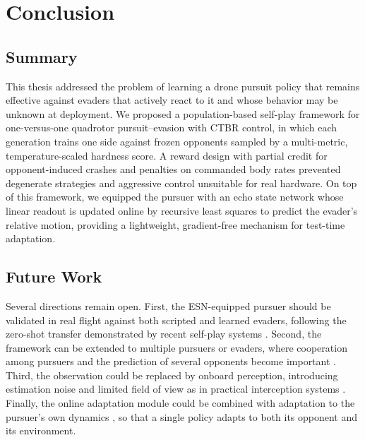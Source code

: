 
\chapter{Conclusion}
\label{ch:conclusion}

\section{Summary}
\noindent
This thesis addressed the problem of learning a drone pursuit policy that remains effective against evaders that actively react to it and whose behavior may be unknown at deployment. We proposed a population-based self-play framework for one-versus-one quadrotor pursuit--evasion with CTBR control, in which each generation trains one side against frozen opponents sampled by a multi-metric, temperature-scaled hardness score. A reward design with partial credit for opponent-induced crashes and penalties on commanded body rates prevented degenerate strategies and aggressive control unsuitable for real hardware. On top of this framework, we equipped the pursuer with an echo state network whose linear readout is updated online by recursive least squares to predict the evader's relative motion, providing a lightweight, gradient-free mechanism for test-time adaptation.


\section{Future Work}
\noindent
Several directions remain open. First, the ESN-equipped pursuer should be validated in real flight against both scripted and learned evaders, following the zero-shot transfer demonstrated by recent self-play systems \cite{tangAgilePEAutonomousUAV2026a, gavinAgileInterceptionFlying2026, ronceroLearnedControllersAgile2026}. Second, the framework can be extended to multiple pursuers or evaders, where cooperation among pursuers and the prediction of several opponents become important \cite{chenOnlinePlanningMultiUAV2025, gavinInterceptingAgileTarget2026}. Third, the observation could be replaced by onboard perception, introducing estimation noise and limited field of view as in practical interception systems \cite{pliskaSafeMidAirDrone2024}. Finally, the online adaptation module could be combined with adaptation to the pursuer's own dynamics \cite{panLearningFlyRapid2026, xingContinualRobotPolicy2026}, so that a single policy adapts to both its opponent and its environment.
